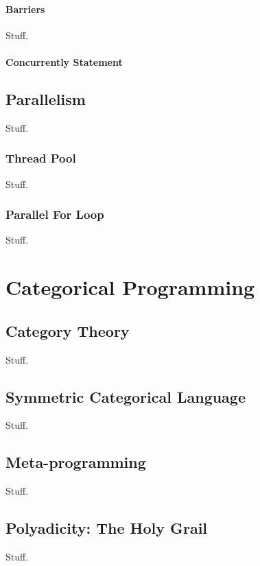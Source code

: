 \documentclass[oneside]{book}
\begin{document}
\subsection{Barriers}
Stuff.
\subsection{Concurrently Statement}

\chapter{Parallelism}
Stuff.
\section{Thread Pool}
Stuff.
\section{Parallel For Loop}
Stuff.

\part{Categorical Programming}
\chapter{Category Theory}
Stuff.
\chapter{Symmetric Categorical Language}
Stuff.
\chapter{Meta-programming}
Stuff.
\chapter{Polyadicity: The Holy Grail}
Stuff.

\appendix
\backmatter
\end{document}
